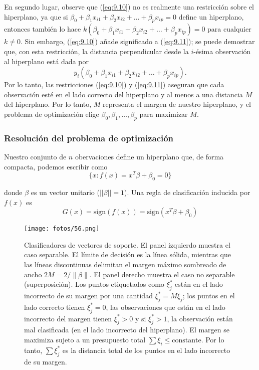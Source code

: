 En segundo lugar, observe que (\ref{eq:9.10}) no es realmente una restricción sobre el hiperplano, ya que si $\beta_0 + \beta_1 x_{i1} + \beta_2 x_{i2} + \ldots + \beta_p x_{ip} = 0$ define un hiperplano, entonces también lo hace $k (\beta_0 + \beta_1 x_{i1} + \beta_2 x_{i2} + \ldots + \beta_p x_{ip}) = 0$ para cualquier $k \neq 0$. Sin embargo, (\ref{eq:9.10}) añade significado a (\ref{eq:9.11}); se puede demostrar que, con esta restricción, la distancia perpendicular desde la $i$-ésima observación al hiperplano está dada por
\begin{equation}
y_i (\beta_0 + \beta_1 x_{i1} + \beta_2 x_{i2} + \ldots + \beta_p x_{ip}).
\end{equation}
Por lo tanto, las restricciones (\ref{eq:9.10}) y (\ref{eq:9.11}) aseguran que cada observación esté en el lado correcto del hiperplano y al menos a una distancia $M$ del hiperplano. Por lo tanto, $M$ representa el margen de nuestro hiperplano, y el problema de optimización elige $\beta_0, \beta_1, \ldots, \beta_p$ para maximizar $M$. 

\subsubsection{Resolución del problema de optimización}

Nuestro conjunto de $n$ obervaciones define un hiperplano que, de forma compacta, podemos escribir como 
\begin{equation}
\{x: f(x) = x^T \beta + \beta_0 = 0\}
\end{equation}

\noindent donde $\beta$ es un vector unitario ($||\beta|| = 1$). Una regla de clasificación inducida por $f(x)$ es 
\begin{equation}
G(x) = \text{sign}(f(x)) = \text{sign}(x^T \beta + \beta_0)
\end{equation}

\begin{figure}[h]
\centering
\texttt{[image: fotos/56.png]}
\caption{Clasificadores de vectores de soporte. El panel izquierdo muestra el caso separable. El límite de decisión es la línea sólida, mientras que las líneas discontinuas delimitan el margen máximo sombreado de ancho $2M = 2/\|\beta\|$. El panel derecho muestra el caso no separable (superposición). Los puntos etiquetados como $\xi^*_j$ están en el lado incorrecto de su margen por una cantidad $\xi^*_j = M \xi_j$; los puntos en el lado correcto tienen $\xi^*_j = 0$, las observaciones que están en el lado incorrecto del margen tienen $\xi_j^* > 0$ y si $\xi_j^* > 1$, la observación están mal clasificada (en el lado incorrecto del hiperplano). El margen se maximiza sujeto a un presupuesto total $\sum \xi_i \leq \text{constante}$. Por lo tanto, $\sum \xi^*_j$ es la distancia total de los puntos en el lado incorrecto de su margen.}
\label{fig:12.1}
\end{figure}

